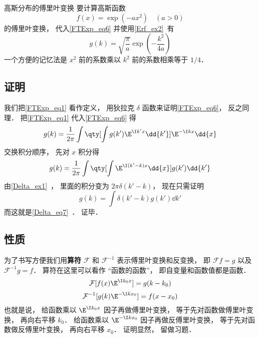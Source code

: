 \begin{example}{高斯分布的傅里叶变换}
要计算高斯函数
\begin{equation}
f(x) = \exp(-ax^2) \quad (a > 0)
\end{equation}
的傅里叶变换， 代入\autoref{FTExp_eq6} 并使用\autoref{Erf_ex2}~有
\begin{equation}
g(k) = \sqrt{\frac{\pi}{a}} \exp(-\frac{k^2}{4a})
\end{equation}
一个方便的记忆法是 $x^2$ 前的系数乘以 $k^2$ 前的系数相乘等于 $1/4$．
\end{example}

\subsection{证明}
我们把\autoref{FTExp_eq1} 看作定义， 用狄拉克 $\delta$ 函数来证明\autoref{FTExp_eq6}， 反之同理． 把\autoref{FTExp_eq1} 代入\autoref{FTExp_eq6} 得
\begin{equation}
g(k) = \frac{1}{2\pi} \int \qty[ \int g(k') \E^{\I k' x} \dd{k'}] \E^{-\I k x} \dd{x}
\end{equation}
交换积分顺序， 先对 $x$ 积分得
\begin{equation}
g(k) = \frac{1}{2\pi} \int \qty[ \int  \E^{\I (k'-k) x} \dd{x}]  g(k')\dd{k'}
\end{equation}
由\autoref{Delta_ex1}~， 里面的积分变为 $2\pi\delta(k'-k)$， 现在只需证明
\begin{equation}
g(k) = \int \delta(k'-k)  g(k')\dd{k'}
\end{equation}
而这就是\autoref{Delta_eq7}~． 证毕．

\subsection{性质}
为了书写方便我们用\textbf{算符} $\mathcal F$ 和 $\mathcal F^{-1}$ 表示傅里叶变换和反变换， 即 $\mathcal F f = g$ 以及 $\mathcal F^{-1} g = f$． 算符在这里可以看作 “函数的函数”， 即自变量和函数值都是函数．
\begin{equation}\label{FTExp_eq4}
\mathcal F [f(x) \E^{\I k_0 x}] = g(k - k_0)
\end{equation}
\begin{equation}
\mathcal F^{-1} [g(k) \E^{-\I k x_0}] = f(x - x_0)
\end{equation}
也就是说， 给函数乘以 $\E^{\I k_0 x}$ 因子再做傅里叶变换， 等于先对函数做傅里叶变换， 再向右平移 $k_0$． 给函数乘以 $\E^{-\I k x_0}$ 因子再做反傅里叶变换， 等于先对函数做反傅里叶变换， 再向右平移 $x_0$． 证明显然， 留做习题．

